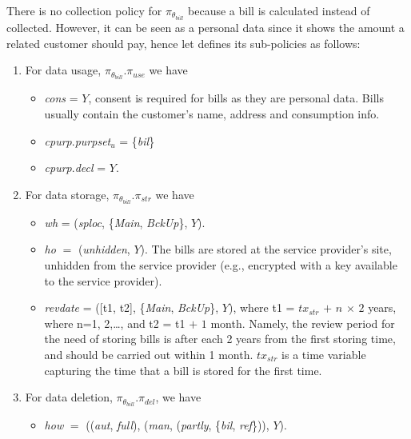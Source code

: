 \documentclass[a4paper]{article}
\begin{document}
\begin{center}
\noindent{}
\end{center} 

There is no collection policy for $\pi_{\theta_{bill}}$ because a bill is calculated instead of collected. However, it can be seen as a personal data since it shows the amount a related customer should pay, hence let defines its sub-policies as follows: 

\begin{enumerate}
\item For data usage, $\pi_{\theta_{bill}}$.$\pi_{use}$ we have 
\begin{itemize}
\item \textit{cons} = $Y$, consent is required for bills as they are personal data. Bills usually contain the customer's name, address and consumption info.   
\item  \textit{cpurp}.\textit{purpset}$_u$ = \{\textit{bil}\}
\item \textit{cpurp}.\textit{decl} = $Y$.  
\end{itemize}

\item For data storage, $\pi_{\theta_{bill}}$.$\pi_{str}$ we have 
\begin{itemize} 
\item \textit{wh} = (\textit{sploc}, \{\textit{Main}, \textit{BckUp}\}, $Y$).     

\item \textit{ho} $=$ (\textit{unhidden}, $Y$). The bills are stored at the service provider's site, unhidden from the service provider (e.g., encrypted with a key available to the service provider). 

\item \textit{revdate} = ([t1, t2], \{\textit{Main}, \textit{BckUp}\}, $Y$), where t1 = $tx_{str}$ $+$ $n$ $\times$ $2$ years, where n={1, 2,\dots,} and t2 = t1 $+$ $1$ month. Namely, the review period for the need of storing bills is   after each 2 years from the first storing time, and should be carried out within 1 month. $tx_{str}$ is a time variable capturing the time that a bill is stored for the first time.
\end{itemize}   

\item For data deletion, $\pi_{\theta_{bill}}$.$\pi_{del}$, we have 
\begin{itemize} 
\item \textit{how} $=$ ((\textit{aut}, \textit{full}), (\textit{man}, (\textit{partly}, \{\textit{bil}, \textit{ref}\})), $Y$).
 

\end{itemize}
\end{enumerate}
\end{document}
